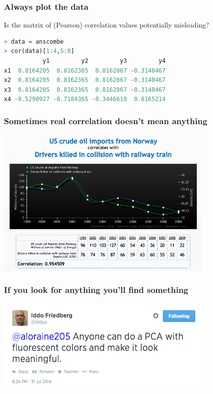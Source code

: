 \begin{frame}[fragile]
  \frametitle{Always plot the data}
    Is the matrix of (Pearson) correlation values potentially misleading?
\begin{lstlisting}[language=R]
> data = anscombe
> cor(data)[1:4,5:8]
           y1         y2         y3         y4
x1  0.8164205  0.8162365  0.8162867 -0.3140467
x2  0.8164205  0.8162365  0.8162867 -0.3140467
x3  0.8164205  0.8162365  0.8162867 -0.3140467
x4 -0.5290927 -0.7184365 -0.3446610  0.8165214
\end{lstlisting}
\end{frame}

\begin{frame}
  \frametitle{Sometimes real correlation doesn't mean anything}
  \begin{center}
    \includegraphics[width=0.8\textwidth]{images/spurious_correlation} \\
  \end{center}
\end{frame}

\begin{frame}
  \frametitle{If you look for anything you'll find something}
  \begin{center}
    \includegraphics[width=0.8\textwidth]{images/twitter_pca} \\
  \end{center}
\end{frame}